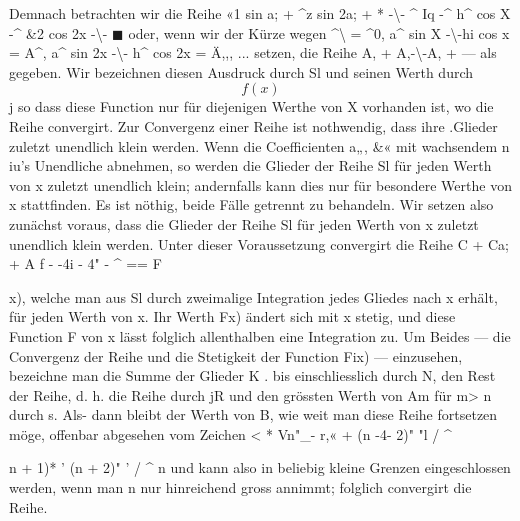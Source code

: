 \documentclass[12pt,a4paper]{book}
\theoremstyle{definition}
\theoremstyle{remark}
\begin{document}
{{{{%
Demnach  betrachten  wir  die  Reihe
«1  sin  a;  +  ^z  sin  2a;  +  *  \textbullet{}  \textbullet{}
-\textbackslash{}-  ^  Iq -^  h^  cos  X  -^  \&2  cos  2x  -\textbackslash{}-  $\blacksquare$  \textbullet{}  \textbullet{}
oder,  wenn  wir  der  Kürze  wegen
^\textbackslash{}  =  ^0,  a^  sin X  -\textbackslash{}-hi  cos x  =  A^,  a^  sin 2x  -\textbackslash{}-  h^  cos 2x  =  Ä,,,  ...
setzen,  die  Reihe
A,  +  A,-\textbackslash{}-A,  +  ---
als  gegeben.  Wir  bezeichnen  diesen  Ausdruck  durch  Sl  und  seinen
Werth  durch  $$f(x)$$j  so  dass  diese  Function  nur  für  diejenigen  Werthe
von  X  vorhanden  ist,  wo  die  Reihe  convergirt.
Zur  Convergenz  einer  Reihe  ist  nothwendig,  dass  ihre  .Glieder
zuletzt  unendlich  klein  werden.  Wenn  die  Coefficienten  a„,  \&«  mit
wachsendem  n  iu's  Unendliche  abnehmen,  so  werden  die  Glieder  der
Reihe  Sl  für  jeden  Werth  von  x  zuletzt  unendlich  klein;  andernfalls
kann  dies  nur  für  besondere  Werthe  von  x  stattfinden.  Es  ist  nöthig,
beide  Fälle  getrennt  zu  behandeln.
Wir  setzen  also  zunächst  voraus,  dass  die  Glieder  der  Reihe  Sl
für  jeden  Werth  von  x  zuletzt  unendlich  klein  werden.
Unter  dieser  Voraussetzung  convergirt  die  Reihe
C  +  Ca;  +  A  f  -  -4i  -  4"  -  ^
\textbullet{}  \textbullet{}  \textbullet{}  ==  F{x),
welche  man  aus  Sl  durch  zweimalige  Integration  jedes  Gliedes  nach  x
erhält,  für  jeden  Werth  von  x.     Ihr  Werth  F{x)  ändert   sich  mit  x
stetig,  und  diese  Function  F  von  x  lässt  folglich  allenthalben  eine
Integration  zu.
Um   Beides  ---  die  Convergenz  der  Reihe  und  die  Stetigkeit  der
Function  Fix)  ---  einzusehen,  bezeichne  man  die  Summe  der  Glieder
K    \textbullet{}         \textbullet{}       .
bis   einschliesslich  durch  N,  den  Rest  der  Reihe,  d.  h.  die  Reihe
durch  jR  und  den  grössten  Werth  von  Am  für  m>  n  durch  s.  Als-
dann bleibt  der  Werth  von  B,  wie  weit  man  diese  Reihe  fortsetzen
möge,  offenbar  abgesehen  vom  Zeichen
<  *  Vn"\_}-  r,«  +  (n  -4-  2)"  "l  /  ^
{{n  +  1)*    '    (n  +  2)"    '  /  ^  n
und  kann  also  in  beliebig  kleine  Grenzen  eingeschlossen  werden,  wenn
man  n  nur  hinreichend  gross  annimmt;  folglich  convergirt  die  Reihe.
\newpage

}}}}}}}
\end{document}
